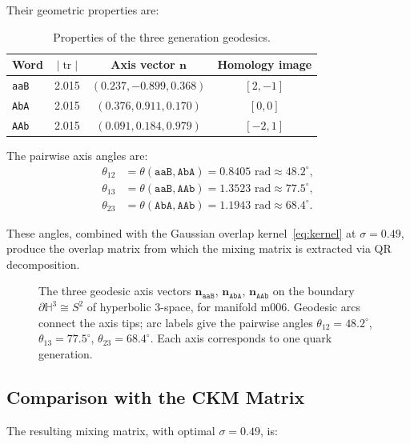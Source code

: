 \documentclass[11pt,a4paper]{article}
\newcommand{\tr}{\operatorname{tr}}
\begin{document}
Their geometric properties are:

\begin{table}[h]
\centering
\begin{tabular}{lccc}
\toprule
Word & $|\tr|$ & Axis vector $\mathbf{n}$ & Homology image \\
\midrule
\texttt{aaB} & 2.015 & $(0.237, -0.899, 0.368)$ & $[2, -1]$ \\
\texttt{AbA} & 2.015 & $(0.376, 0.911, 0.170)$ & $[0, 0]$ \\
\texttt{AAb} & 2.015 & $(0.091, 0.184, 0.979)$ & $[-2, 1]$ \\
\bottomrule
\end{tabular}
\caption{Properties of the three generation geodesics.}
\label{tab:generations}
\end{table}

The pairwise axis angles are:
\begin{align}
\theta_{12} &= \theta(\texttt{aaB}, \texttt{AbA}) = 0.8405 \text{ rad} \approx 48.2^\circ, \\
\theta_{13} &= \theta(\texttt{aaB}, \texttt{AAb}) = 1.3523 \text{ rad} \approx 77.5^\circ, \\
\theta_{23} &= \theta(\texttt{AbA}, \texttt{AAb}) = 1.1943 \text{ rad} \approx 68.4^\circ.
\end{align}

These angles, combined with the Gaussian overlap kernel~\eqref{eq:kernel} at
$\sigma = 0.49$, produce the overlap matrix from which the mixing
matrix is extracted via QR decomposition.

\begin{figure}[h]
\centering
\caption{The three geodesic axis vectors $\mathbf{n}_{\texttt{aaB}}$,
$\mathbf{n}_{\texttt{AbA}}$, $\mathbf{n}_{\texttt{AAb}}$ on the boundary
$\partial\mathbb{H}^3 \cong S^2$ of hyperbolic 3-space, for manifold m006.
Geodesic arcs connect the axis tips; arc labels give the pairwise angles
$\theta_{12} = 48.2^\circ$, $\theta_{13} = 77.5^\circ$, $\theta_{23} = 68.4^\circ$.
Each axis corresponds to one quark generation.}
\label{fig:poincare}
\end{figure}

\subsection{Comparison with the CKM Matrix}
\label{subsec:comparison}

The resulting mixing matrix, with optimal $\sigma = 0.49$, is:
\end{document}
